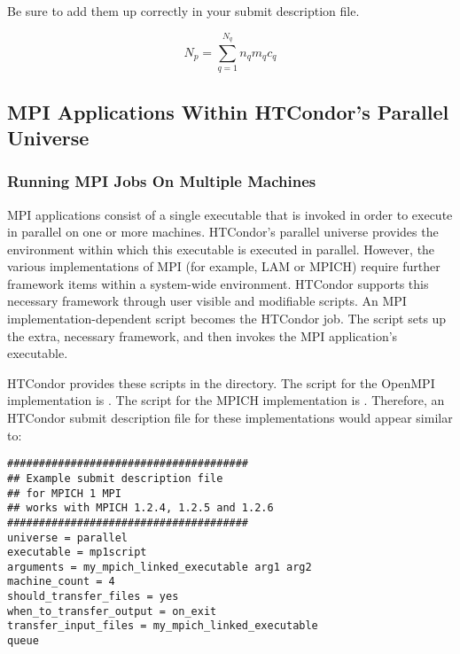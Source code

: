 Be sure to add them up correctly in your submit description file.

\begin{equation}
  \label{eq:sum-number-of-cpus}
  N_{p} = \sum^{N_q}_{q=1} n_q m_q c_q
\end{equation}

\subsection{\label{sec:parallel-mpi-submit}MPI Applications Within HTCondor's Parallel Universe}

\subsubsection{\label{sec:parallel-mpi-submit-multiple}
Running MPI Jobs On Multiple Machines}

MPI applications consist of a single executable that is invoked in order to
execute in parallel on one or more machines. 
HTCondor's parallel universe provides the environment within
which this executable is executed in parallel.
However, the various implementations of MPI
(for example, LAM or MPICH) require further framework items within
a system-wide environment.
HTCondor supports this necessary framework through 
user visible and modifiable scripts.
An MPI implementation-dependent script becomes the HTCondor job.
The script sets up the extra, necessary framework,
and then invokes the MPI application's executable.

HTCondor provides these scripts in the
directory.
The script for the OpenMPI implementation is .
The script for the MPICH implementation is .
Therefore, an HTCondor submit description file for these
implementations would appear similar to:

\begin{verbatim}
######################################
## Example submit description file
## for MPICH 1 MPI
## works with MPICH 1.2.4, 1.2.5 and 1.2.6
######################################
universe = parallel
executable = mp1script
arguments = my_mpich_linked_executable arg1 arg2
machine_count = 4
should_transfer_files = yes
when_to_transfer_output = on_exit
transfer_input_files = my_mpich_linked_executable
queue
\end{verbatim}

